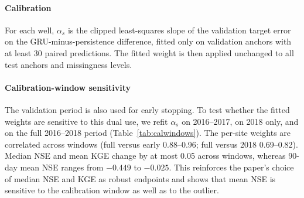\documentclass[preprint,12pt]{elsarticle}
\begin{document}
\paragraph{Calibration}
For each well, $\alpha_s$ is the clipped least-squares slope of the validation
target error on the GRU-minus-persistence difference, fitted only on validation
anchors with at least 30 paired predictions. The fitted weight is then applied
unchanged to all test anchors and missingness levels.

\paragraph{Calibration-window sensitivity}
The validation period is also used for early stopping. To test whether the
fitted weights are sensitive to this dual use, we refit $\alpha_s$ on
2016--2017, on 2018 only, and on the full 2016--2018 period (Table~\ref{tab:calwindows}).
The per-site weights are correlated across windows (full versus early
0.88--0.96; full versus 2018 0.69--0.82). Median NSE and mean KGE change by at
most 0.05 across windows, whereas 90-day mean NSE ranges from $-0.449$ to
$-0.025$. This reinforces the paper's choice of median NSE and KGE as robust
endpoints and shows that mean NSE is sensitive to the calibration window as
well as to the outlier.

\begin{table}[t]
\centering
\caption{Calibration-window sensitivity (mean across seeds 1--3). $N$ is the
number of validation anchors at 30/90 days. The full window is used for the
main results; the early and 2018-only windows are sensitivity checks.}
\label{tab:calwindows}
\end{table}
\end{document}
